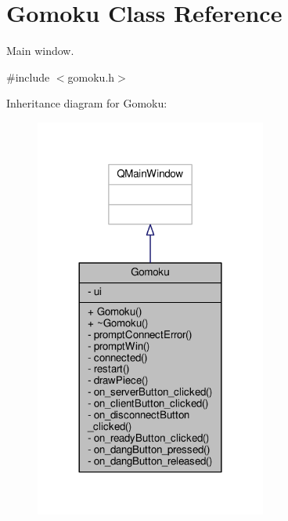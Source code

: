 \hypertarget{classGomoku}{}\section{Gomoku Class Reference}
\label{classGomoku}


Main window.  




{\ttfamily \#include $<$gomoku.\+h$>$}



Inheritance diagram for Gomoku\+:
\nopagebreak
\begin{figure}[H]
\begin{center}
\leavevmode
\includegraphics[width=216pt]{classGomoku__inherit__graph}
\end{center}
\end{figure}



